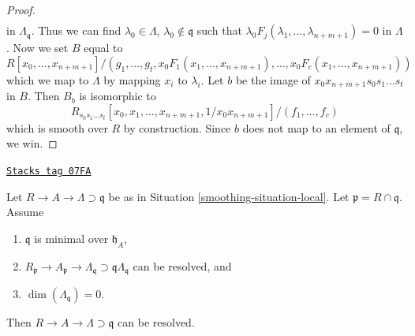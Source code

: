 \begin{proof}
\begin{align*}
\end{align*}
in $\Lambda_\mathfrak q$. Thus we can find
$\lambda_0 \in \Lambda$, $\lambda_0 \not \in \mathfrak q$ such that
$\lambda_0 F_j(\lambda_1, \ldots, \lambda_{n + m + 1}) = 0$
in $\Lambda$. Now we set $B$ equal to
$$
R[x_0, \ldots, x_{n + m + 1}]/
(g_1, \ldots, g_t, x_0F_1(x_1, \ldots, x_{n + m + 1}), \ldots,
x_0F_c(x_1, \ldots, x_{n + m + 1}))
$$
which we map to $\Lambda$ by mapping $x_i$ to $\lambda_i$.
Let $b$ be the image of $x_0 x_{n + m + 1} s_0 s_1 \ldots s_t$ in $B$.
Then $B_b$ is isomorphic to
$$
R_{s_0s_1 \ldots s_t}[x_0, x_1, \ldots, x_{n + m + 1}, 1/x_0x_{n + m + 1}]/
(f_1, \ldots, f_c)
$$
which is smooth over $R$ by construction.
Since $b$ does not map to an element of $\mathfrak q$, we win.
\end{proof}

\begin{lemma}
\label{smoothing-lemma-delocalize-height-zero}
\href{https://stacks.math.columbia.edu/tag/07FA}{\texttt{Stacks tag 07FA}}

Let $R \to A \to \Lambda \supset \mathfrak q$ be as in
Situation \ref{smoothing-situation-local}. Let $\mathfrak p = R \cap \mathfrak q$.
Assume
\begin{enumerate}
\item $\mathfrak q$ is minimal over $\mathfrak h_A$,
\item $R_\mathfrak p \to A_\mathfrak p \to \Lambda_\mathfrak q
\supset \mathfrak q\Lambda_\mathfrak q$ can be resolved, and
\item $\dim(\Lambda_\mathfrak q) = 0$.
\end{enumerate}
Then $R \to A \to \Lambda \supset \mathfrak q$ can be resolved.
\end{lemma}

